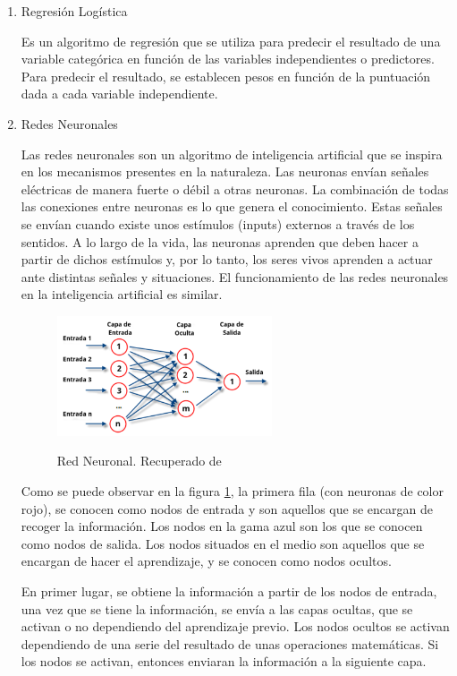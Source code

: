 \begin{enumerate}
\item Regresión Logística

Es un algoritmo de regresión que se utiliza para predecir el resultado de una variable categórica en función de las variables independientes o predictores. Para predecir el resultado, se establecen pesos en función de la puntuación dada a cada variable independiente.

\item Redes Neuronales

Las redes neuronales son un algoritmo de inteligencia artificial que se inspira en los mecanismos presentes en la naturaleza. Las neuronas envían señales eléctricas de manera fuerte o débil a otras neuronas. La combinación de todas las conexiones entre neuronas es lo que genera el conocimiento. Estas señales se envían cuando existe unos estímulos (inputs) externos a través de los sentidos. A lo largo de la vida, las neuronas aprenden que deben hacer a partir de dichos estímulos y, por lo tanto, los seres vivos aprenden a actuar ante distintas señales y situaciones. El funcionamiento de las redes neuronales en la inteligencia artificial es similar.

\begin{figure}[htb]
\centering
\caption{Red Neuronal. Recuperado de \protect{}}
 \includegraphics[width=0.6\textwidth]{recursos/RedNeuronalArtificial}
\label {fig:RedNeuronal}
\end{figure}
\FloatBarrier

Como se puede observar en la figura \ref{fig:RedNeuronal}, la primera fila (con neuronas de color rojo), se conocen como nodos de entrada y son aquellos que se encargan de recoger la información. Los nodos en la gama azul son los que se conocen como nodos de salida. Los nodos situados en el medio son aquellos que se encargan de hacer el aprendizaje, y se conocen como nodos ocultos.

En primer lugar, se obtiene la información a partir de los nodos de entrada, una vez que se tiene la información, se envía a las capas ocultas, que se activan o no dependiendo del aprendizaje previo. Los nodos ocultos se activan dependiendo de una serie del resultado de unas operaciones matemáticas. Si los nodos se activan, entonces enviaran la información a la siguiente capa.


\end{enumerate}
